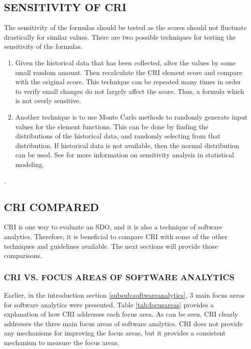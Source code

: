 \documentclass[SDSUThesis.tex]{subfiles}
\begin{document}
    \subsection{SENSITIVITY OF CRI}
    \label{sec:sensitivity}
        The sensitivity of the formulas should be tested as the scores should not
        fluctuate drastically for similar values.  There are two possible techniques
        for testing the sensitivity of the formulas. 
        \begin{enumerate}
            \item Given the historical data that has been collected,
                alter the values by some small random amount.  Then recalculate
                the CRI element score and compare with the original score.  This
                technique can be repeated many times in order to verify
                small changes do not largely affect the score.  Thus, a 
                formula which is not overly sensitive. 
            \item Another technique is to use Monte Carlo methods to 
                randomly generate input values for the element functions.  
                This can be done by finding the distributions of the historical
                data, and randomly selecting from that distribution.  If historical
                data is not available, then the normal distribution can be used.
                See \cite{Saltelli2000} for more information on sensitivity analysis 
                in statistical modeling.
        \end{enumerate}
        
        .

    \subsection{CRI COMPARED}
        CRI is one way to evaluate an SDO, and it is also a technique of
        software analytics.  Therefore, it is beneficial to compare CRI
        with some of the other techniques and guidelines available. The
        next sections will provide those comparisons.
    
        \subsubsection{CRI VS. FOCUS AREAS OF SOFTWARE ANALYTICS}
    
            Earlier, in the introduction section \ref{subsub:softwareanalytics}, 3 main focus 
            areas  for software
            analytics were presented.  Table \ref{tab:focusareas} provides a explanation of how CRI addresses
            each focus area.  
            As can be seen, CRI clearly addresses the three main focus areas of software analytics.  CRI does not provide
            any mechanisms for improving the focus areas, but it provides a consistent mechanism to measure
            the focus areas. 
            
\end{document}
